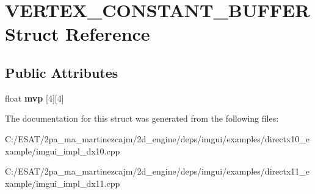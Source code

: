 \hypertarget{struct_v_e_r_t_e_x___c_o_n_s_t_a_n_t___b_u_f_f_e_r}{}\section{V\+E\+R\+T\+E\+X\+\_\+\+C\+O\+N\+S\+T\+A\+N\+T\+\_\+\+B\+U\+F\+F\+ER Struct Reference}
\label{struct_v_e_r_t_e_x___c_o_n_s_t_a_n_t___b_u_f_f_e_r}
\subsection*{Public Attributes}
\begin{DoxyCompactItemize}
\item 
\mbox{\label{struct_v_e_r_t_e_x___c_o_n_s_t_a_n_t___b_u_f_f_e_r_a20cdd6ad3444c20ffe87c73a20439160}} 
float {\bfseries mvp} \mbox{[}4\mbox{]}\mbox{[}4\mbox{]}
\end{DoxyCompactItemize}


The documentation for this struct was generated from the following files\+:\begin{DoxyCompactItemize}
\item 
C\+:/\+E\+S\+A\+T/2pa\+\_\+ma\+\_\+martinezcajm/2d\+\_\+engine/deps/imgui/examples/directx10\+\_\+example/imgui\+\_\+impl\+\_\+dx10.\+cpp\item 
C\+:/\+E\+S\+A\+T/2pa\+\_\+ma\+\_\+martinezcajm/2d\+\_\+engine/deps/imgui/examples/directx11\+\_\+example/imgui\+\_\+impl\+\_\+dx11.\+cpp\end{DoxyCompactItemize}
